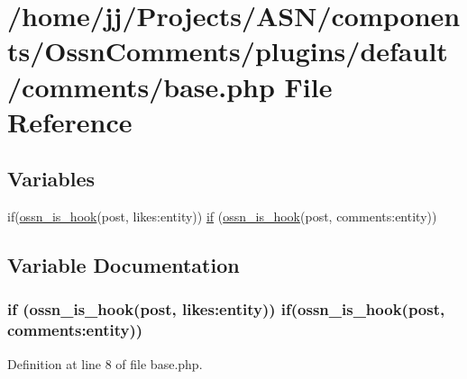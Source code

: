 \hypertarget{base_8php}{}\section{/home/jj/\+Projects/\+A\+S\+N/components/\+Ossn\+Comments/plugins/default/comments/base.php File Reference}
\label{base_8php}
\subsection*{Variables}
\begin{DoxyCompactItemize}
\item 
if(\hyperlink{ossn_8lib_8system_8php_ae29c30c131d7600928d7a2fc28bcd322}{ossn\+\_\+is\+\_\+hook}(\textquotesingle{}post\textquotesingle{}, \textquotesingle{}likes\+:entity\textquotesingle{})) \hyperlink{base_8php_a59b44b8868ee9a897d4beed1b4d90396}{if} (\hyperlink{ossn_8lib_8system_8php_ae29c30c131d7600928d7a2fc28bcd322}{ossn\+\_\+is\+\_\+hook}(\textquotesingle{}post\textquotesingle{}, \textquotesingle{}comments\+:entity\textquotesingle{}))
\end{DoxyCompactItemize}


\subsection{Variable Documentation}
\subsubsection[{\texorpdfstring{if}{if}}]{\setlength{\rightskip}{0pt plus 5cm}if ({\bf ossn\+\_\+is\+\_\+hook}(\textquotesingle{}post\textquotesingle{}, \textquotesingle{}likes\+:entity\textquotesingle{})) if({\bf ossn\+\_\+is\+\_\+hook}(\textquotesingle{}post\textquotesingle{}, \textquotesingle{}comments\+:entity\textquotesingle{}))}\hypertarget{base_8php_a59b44b8868ee9a897d4beed1b4d90396}{}\label{base_8php_a59b44b8868ee9a897d4beed1b4d90396}


Definition at line 8 of file base.\+php.

